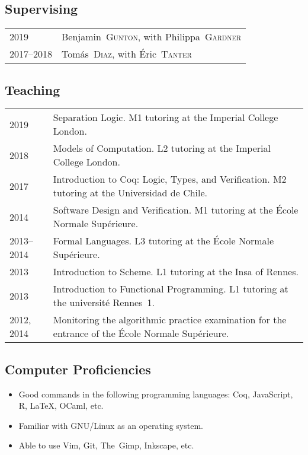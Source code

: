 \documentclass[12pt,a4paper]{article}
\makeatletter
\newcommand{\fr}[1]{\foreignlanguage{french}{{#1}}}
\newcommand{\es}[1]{\foreignlanguage{spanish}{{#1}}}
\newcommand{\fr}[1]{\foreignlanguage{francais}{{#1}}}
\newcommand{\es}[1]{\foreignlanguage{spanish}{{#1}}}
\newenvironment{datecvsection}[1]%
               {\subsection*{#1}%
                 \noindent \begin{tabular}{@{}p{\annee}p{\texte}@{}}}
               {\end{tabular}}
\newenvironment{itemcvsection}[1]%
               {\subsection*{#1}\begin{itemize}}
               {\end{itemize}}
\newcommand\familyName{\textsc}
\newcommand\placeName{}
\makeatother
\begin{document}
\begin{datecvsection}{Supervising}

    2019 & Benjamin~\familyName{Gunton}, with Philippa~\familyName{Gardner} \\
    2017–2018 & Tomás~\familyName{Diaz}, with Éric~\familyName{Tanter} \\

\end{datecvsection}

\begin{datecvsection}{Teaching}

    2019 & Separation Logic. M1 tutoring at the Imperial College London. \\

    2018 & Models of Computation. L2 tutoring at the Imperial College London. \\

    2017 & Introduction to Coq: Logic, Types, and Verification. M2 tutoring at the \es{\placeName{Universidad de Chile}}. \\

    2014 & Software Design and Verification. M1 tutoring at the \fr{\placeName{École Normale Supérieure}}. \\

    2013–2014 & Formal Languages. L3 tutoring at the \fr{\placeName{École Normale Supérieure}}. \\

    2013 & Introduction to Scheme. L1 tutoring at the \placeName{Insa} of \placeName{Rennes}. \\

    2013 & Introduction to Functional Programming. L1 tutoring at the \fr{université \placeName{Rennes}~1}. \\

    2012, 2014 & Monitoring the algorithmic practice examination for the entrance of the \fr{\placeName{École Normale Supérieure}}. \\

\end{datecvsection}

\begin{itemcvsection}{Computer Proficiencies}

	\item Good commands in the following programming languages:  Coq, JavaScript, R, \LaTeX, OCaml, etc.
	\item Familiar with GNU/Linux as an operating system.
	\item Able to use Vim, Git, The~Gimp, Inkscape, etc.

\end{itemcvsection}
\end{document}
